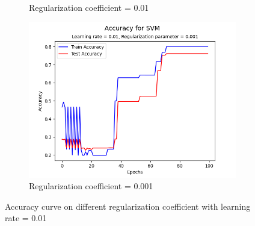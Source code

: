 \documentclass[a4paper, utf8]{ctexart}
\begin{document}
\begin{figure}[htbp]
\begin{subfigure}{.45\textwidth}
			\caption{Regularization coefficient = 0.01}
		\end{subfigure}
		\begin{subfigure}{.45\textwidth}
			\centering
			\includegraphics[width=.9\textwidth]{./figure/myplotS5.png}
			\caption{Regularization coefficient = 0.001}
		\end{subfigure}
		\caption{Accuracy curve on different regularization coefficient with learning rate = 0.01}
	\end{figure}
	
\end{document}
